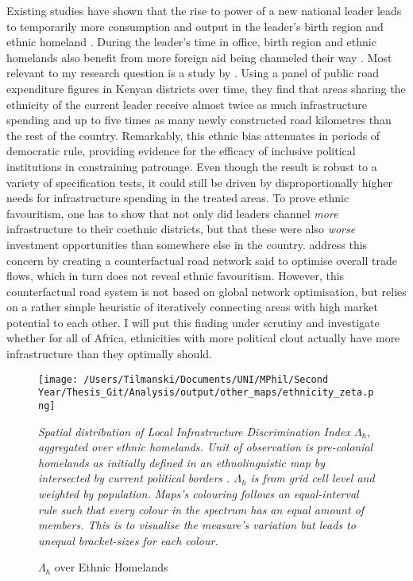 \documentclass[11pt, oneside]{article}   	%
\newcommand{\mysubcaption}[1]{
\justify
\begin{spacing}{0.7}
\textit{\footnotesize #1}
\end{spacing}}
\begin{document}
Existing studies have shown that the rise to power of a new national leader leads to temporarily more consumption and output in the leader's birth region \citep{Hodler_RegionalFavoritism_2014} and ethnic homeland \citep{DeLuca_Ethnicfavoritismaxiom_2018}. During the leader's time in office, birth region and ethnic homelands also benefit from more foreign aid being channeled their way \citep{Dreher_AiddemandAfrican_2016}. Most relevant to my research question is a study by \cite{burgess_value_2015}. Using a panel of public road expenditure figures in Kenyan districts over time, they find that areas sharing the ethnicity of the current leader receive almost twice as much infrastructure spending and up to five times as many newly constructed road kilometres than the rest of the country. Remarkably, this ethnic bias attenuates in periods of democratic rule, providing evidence for the efficacy of inclusive political institutions in constraining patronage. Even though the result is robust to a variety of specification tests, it could still be driven by disproportionally higher needs for infrastructure spending in the treated areas. To prove ethnic favouritism, one has to show that not only did leaders channel \emph{more} infrastructure to their coethnic districts, but that these were also \emph{worse} investment opportunities than somewhere else in the country. \citeauthor{burgess_value_2015} address this concern by creating a counterfactual road network said to optimise overall trade flows, which in turn does not reveal ethnic favouritism. However, this counterfactual road system is not based on global network optimisation, but relies on a rather simple heuristic of iteratively connecting areas with high market potential to each other. I will put this finding under scrutiny and investigate whether for all of Africa, ethnicities with more political clout actually have more infrastructure than they optimally should.

\begin{figure}
\centering
\caption{$\Lambda_{h}$ over Ethnic Homelands}

\texttt{[image: /Users/Tilmanski/Documents/UNI/MPhil/Second Year/Thesis\_Git/Analysis/output/other\_maps/ethnicity\_zeta.png]}


\label{fig:ethn_maps}
\mysubcaption{Spatial distribution of Local Infrastructure Discrimination Index $\Lambda_{h}$, aggregated over ethnic homelands. Unit of observation is pre-colonial homelands as initially defined in an ethnolinguistic map by \cite{Murdock_Africaitspeoples_1959} intersected by current political borders  \citep[following][]{michalopoulos_long-run_2016}. $\Lambda_{h}$ is from grid cell level and weighted by population. Maps's colouring follows an equal-interval rule such that every colour in the spectrum has an equal amount of members. This is to visualise the measure's variation but leads to unequal bracket-sizes for each colour.}
\end{figure}
\end{document}
